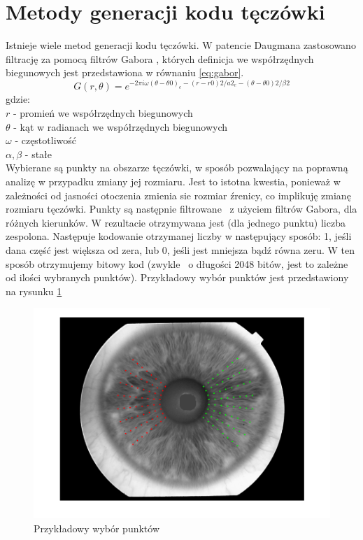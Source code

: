 \section{Metody generacji kodu tęczówki}
\label{sec:metodyGeneracjiKodu}

Istnieje wiele metod generacji kodu tęczówki. W patencie Daugmana zastosowano filtrację za pomocą filtrów Gabora \cite{Daugman}, których definicja we współrzędnych biegunowych jest przedstawiona w równaniu \ref{eq:gabor}.
\begin{equation}
\label{eq:gabor}
G(r,\theta) = e^{-2\pi i\omega (\theta - \theta 0)_{e}-(r - r0)2/a2_{e}-(\theta-\theta 0 )2/\beta 2}
\end{equation}
gdzie:\\
$r$ - promień we współrzędnych biegunowych \\
$\theta$ - kąt w radianach we współrzędnych biegunowych \\
$ \omega $ - częstotliwość \\
$ \alpha, \beta $ - stałe \\
Wybierane są punkty na obszarze tęczówki, w sposób pozwalający na poprawną analizę w przypadku zmiany jej rozmiaru. Jest to istotna kwestia, ponieważ w zależności od jasności otoczenia zmienia sie rozmiar źrenicy, co implikuję zmianę rozmiaru tęczówki. Punkty są następnie filtrowane ~z użyciem filtrów Gabora, dla różnych kierunków. W rezultacie otrzymywana jest (dla jednego punktu) liczba zespolona. Następuje kodowanie otrzymanej liczby w następujący sposób: 1, jeśli dana część jest większa od zera, lub 0, jeśli jest mniejsza bądź równa zeru. W ten sposób otrzymujemy bitowy kod (zwykle ~o długości 2048 bitów, jest to zależne od ilości wybranych punktów). Przykładowy wybór punktów jest przedstawiony na rysunku \ref{fig:przykladPunkty}

\begin{center}
\begin{figure}
\label{fig:przykladPunkty}
\includegraphics[scale=0.5]{punkty.png}
\caption{Przykładowy wybór punktów}
\end{figure}
\end{center}

